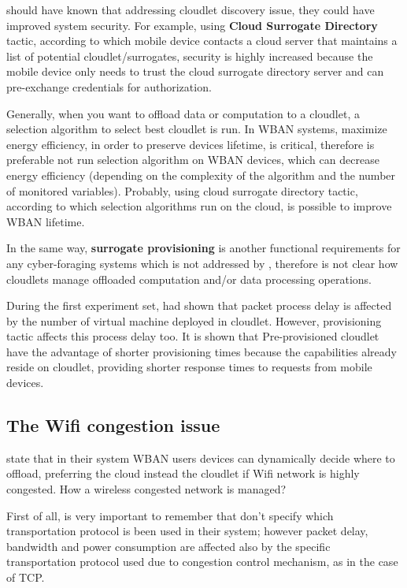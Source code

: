\documentclass[sigchi]{acmart}
\begin{document}
\vspace{0.3cm}

\citet{MSAReport} should have known that addressing cloudlet discovery issue, they could have improved system security. For example, using \textbf{Cloud Surrogate Directory} tactic, according to which mobile device contacts a cloud server that maintains a list of potential cloudlet/surrogates, security is highly increased because the mobile device only needs to trust the cloud surrogate directory server and can pre-exchange credentials for authorization. 

Generally, when you want to offload data or computation to a cloudlet, a selection algorithm to select best cloudlet is run. In WBAN systems, maximize energy efficiency, in order to preserve devices lifetime, is critical, therefore is preferable not run selection algorithm on WBAN devices, which can decrease energy efficiency (depending on the complexity of the algorithm and the number of monitored variables). Probably, using cloud surrogate directory tactic, according to which selection algorithms run on the cloud, is possible to improve WBAN lifetime. \cite{DecisionModel}

In the same way, \textbf{surrogate provisioning} is another functional requirements for any cyber-foraging systems which is not addressed by \citep{MSAReport}, therefore is not clear how cloudlets manage offloaded computation and/or data processing operations.

During the first experiment set, \citet{MSAReport} had shown that packet process delay is affected by the number of virtual machine deployed in cloudlet. However, provisioning tactic affects this process delay too. It is shown that Pre-provisioned cloudlet have the advantage of shorter provisioning times because the capabilities already reside on cloudlet, providing shorter response times to requests from mobile devices.\cite{DecisionModel}

\subsection{The Wifi congestion issue}

\citet{MSAReport} state that in their system WBAN users devices can dynamically decide where to offload, preferring the cloud instead the cloudlet if Wifi network is highly congested. How a wireless congested network is managed?

First of all, is very important to remember that \citet{MSAReport} don't specify which transportation protocol is been used in their system; however packet delay, bandwidth and power consumption are affected also by the specific transportation protocol used due to congestion control mechanism, as in the case of TCP.
\end{document}
